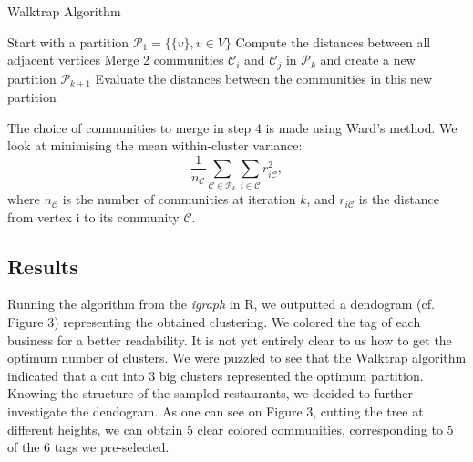 \documentclass[twoside]{article}
\begin{document}
\begin{multicols}{2}
\begin{algorithm}[H]
\caption{Walktrap Algorithm}\label{euclid}
\begin{algorithmic}[1]
\State Start with a partition $\mathcal{P}_1=\{\{v\}, v \in V\}$
\State Compute the distances between all adjacent vertices
\State Merge 2 communities $\mathcal{C}_i$ and $\mathcal{C}_j$ in $\mathcal{P}_k$ and create a new partition $\mathcal{P}_{k+1}$
\State Evaluate the distances between the communities in this new partition
\EndWhile
\end{algorithmic}
\end{algorithm}

\noindent The choice of communities to merge in step 4 is made using Ward's method. We look at minimising the mean within-cluster variance:
$$\frac{1}{n_\mathcal{C}}\sum\limits_{\mathcal{C}\in\mathcal{P}_{k}}\sum\limits_{i\in\mathcal{C}}r^2_{i\mathcal{C}},$$
\noindent where $n_\mathcal{C}$ is the number of communities at iteration $k$, and $r_{i\mathcal{C}}$ is the distance from vertex i to its community $\mathcal{C}$.\\

\subsection{Results}

Running the algorithm from the \emph{igraph} in R, we outputted a dendogram (cf. Figure 3) representing the obtained clustering. We colored the tag of each business for a better readability.  It is not yet entirely clear to us how to get the optimum number of clusters. We were puzzled to see that the Walktrap algorithm indicated that a cut into 3 big clusters represented the optimum partition. Knowing the structure of the sampled restaurants, we decided to further investigate the dendogram. As one can see on Figure 3, cutting the tree at different heights, we can obtain 5 clear colored communities, corresponding to 5 of the 6 tags we pre-selected.\\


\end{multicols}
\end{document}
